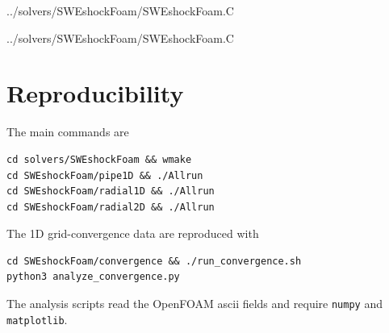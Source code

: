 ﻿\documentclass[11pt,a4paper]{article}
\begin{document}

  {../solvers/SWEshockFoam/SWEshockFoam.C}

\clearpage

  {../solvers/SWEshockFoam/SWEshockFoam.C}

\section{Reproducibility}

The main commands are
\begin{verbatim}
cd solvers/SWEshockFoam && wmake
cd SWEshockFoam/pipe1D && ./Allrun
cd SWEshockFoam/radial1D && ./Allrun
cd SWEshockFoam/radial2D && ./Allrun
\end{verbatim}
The 1D grid-convergence data are reproduced with
\begin{verbatim}
cd SWEshockFoam/convergence && ./run_convergence.sh
python3 analyze_convergence.py
\end{verbatim}
The analysis scripts read the OpenFOAM ascii fields and require
\texttt{numpy} and \texttt{matplotlib}.
\end{document}
